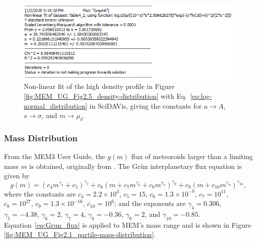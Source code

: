 \documentclass{article}
\begin{document}
\begin{figure}[!htb]
	\centering
	\includegraphics[scale=0.85]{Fit-to-MEM_high_dens.PNG}
	\caption{Non-linear fit of the high density profile in Figure \ref{fig:MEM_UG_Fig2.5_density-distribution} with Eq.\ \ref{eq:log-normal_distribution} in \textsf{SciDAVis}, giving the constants for $a\rightarrow A$, $s\rightarrow \sigma$, and $m\rightarrow \mu_\delta$.}\label{fig:Fit-to-MEM_high_dens}
\end{figure}
\clearpage

\subsubsection{Mass Distribution}


From the MEM3 User Guide, the $g(m)$ flux of meteoroids larger than a limiting mass $m$ is obtained, originally from \cite{grun1985collisional}. The Gr{\"u}n interplanetary flux equation is given by
\begin{equation}\label{eq:Grun_flux}
g(m) = (c_4m^{\gamma_4}+c_5)^{\gamma_5} + c_6(m + c_7m^{\gamma_6} + c_8m^{\gamma_7})^{\gamma_8} + c_9(m + c_{10}m^{\gamma_9})^{\gamma_{10}},
\end{equation}
where the constants are $c_4 = 2.2\times 10^3$, $c_5 = 15$, $c_6 = 1.3 \times 10^{-9}$, $c_7=10^{11}$, $c_8=10^{27}$, $c_9 = 1.3\times 10^{-16}$, $c_{10} = 10^6$; and the exponents are $\gamma_4 = 0.306$, $\gamma_5 = -4.38$, $\gamma_6 = 2$, $\gamma_7 = 4$, $\gamma_8 = -0.36$, $\gamma_{9} = 2$, and $\gamma_{10} = -0.85$. Equation\ \ref{eq:Grun_flux} is applied to MEM's mass range and is shown in Figure \ref{fig:MEM_UG_Fig2.1_partile-mass-distribution}.
\end{document}

